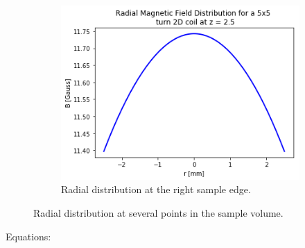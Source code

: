 \documentclass[%
 reprint,
 amsmath,
 amssymb,
 aps,
]{revtex4-1}
\begin{document}
\begin{figure}
            \hfill
            \begin{subfigure}[b]{0.3\textwidth}
                \centering
                \includegraphics[width=\textwidth]{rad25.png}
                \caption{Radial distribution at the right sample edge.}
                \label{fig:five over x}
            \end{subfigure}
            \caption{Radial distribution at several points in the sample volume.}
            \label{fig:three graphs}
        \end{figure}

	Equations:
\end{document}
